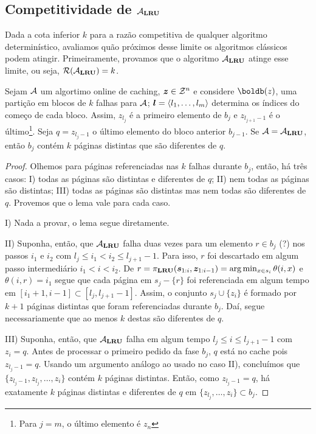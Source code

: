 \subsection{Competitividade de \(\mathcal{A}_{\mathbf{LRU}}\)}

Dada a cota inferior \(k\) para a razão competitiva de qualquer algoritmo determinístico, avaliamos quão próximos desse limite os algoritmos clássicos podem atingir. Primeiramente, provamos que o algoritmo \(\mathcal{A}_{\mathbf{LRU}}\) atinge esse limite, ou seja, \(\mathcal{R}(\mathcal{A}_{\mathbf{LRU}}) = k\).

\begin{lemma}
  \label{lem:k-part}
  Sejam \(\mathcal{A}\) um algortimo online de caching, \(\bm{z} \in \mathcal{Z}^n\) e considere \(\boldb(z)\), uma partição em blocos de \(k\) falhas para \(\mathcal{A}\); \(\bm{l} = \langle l_1, \dotsc, l_m\rangle\) determina os índices do começo de cada bloco. Assim, \(z_{l_j}\) é a primeiro elemento de \(b_j\) e \(z_{l_{j+1}-1}\) é o último\footnote{Para \(j=m\), o último elemento é \(z_n\)}. Seja \(q = z_{l_j-1}\) o último elemento do bloco anterior \(b_{j-1}\). Se \(\mathcal{A} = \mathcal{A}_{\mathbf{LRU}}\), então \(b_j\) contém \(k\) páginas distintas que são diferentes de \(q\). 

  \begin{proof} Olhemos para páginas referenciadas nas \(k\) falhas durante \(b_j\), então, há três casos: I) todas as páginas são distintas e diferentes de \(q\); II) nem todas as páginas são distintas; III) todas as páginas são distintas mas nem todas são diferentes de \(q\). Provemos que o lema vale para cada caso.

  I) Nada a provar, o lema segue diretamente.

  II) Suponha, então, que \(\mathcal{A}_{\mathbf{LRU}}\) falha duas vezes para um elemento \(r \in b_j\) (?) nos passos \(i_1\) e \(i_2\) com \(l_j \le i_1 < i_2 \le l_{j+1} - 1\). Para isso, \(r\) foi descartado em algum passo intermediário \(i_1 < i < i_2\). De \(r = \pi_{\mathbf{LRU}}(\bm{s}_{1:i}, \bm{z}_{1:i-1}) = \arg\min_{x \in s_i} \theta(i, x)\) e \(\theta(i, r) = i_1\) segue que cada página em \(s_j - \{r\}\) foi referenciada em algum tempo em \([i_1+1, i-1] \subset [l_j, l_{j+1}-1]\). Assim, o conjunto \(s_j \cup \{z_i\}\) é formado por \(k+1\) páginas distintas que foram referenciadas durante \(b_j\). Daí, segue necessariamente que ao menos \(k\) destas são diferentes de \(q\).

  III) Suponha, então, que \(\mathcal{A}_{\mathbf{LRU}}\) falha em algum tempo \(l_j \le i \le l_{j+1}-1\) com \(z_i = q\). Antes de processar o primeiro pedido da fase \(b_j\), \(q\) está no cache pois \(z_{l_j-1} = q\). Usando um argumento análogo ao usado no caso II), concluímos que \(\{z_{l_j-1}, z_{l_j}, \dotsc, z_i\}\) contém \(k\) páginas distintas. Então, como \(z_{l_j-1} = q\), há exatamente \(k\) páginas distintas e diferentes de \(q\) em \(\{z_{l_j}, \dotsc, z_i\} \subset b_j\).

\end{proof}
\end{lemma}

